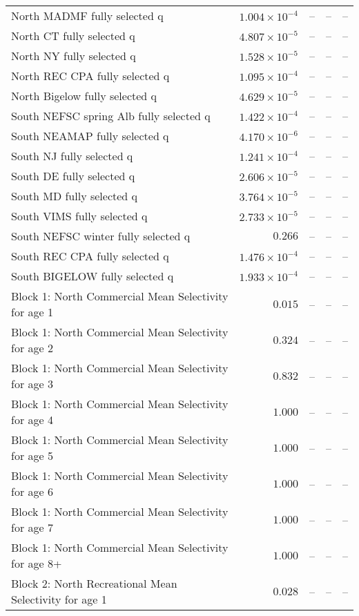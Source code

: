 \documentclass[
]{article}
\begin{document}
\begin{landscape}
\begin{longtable}[t]{lrrrr}
North MADMF fully selected q & $1.004\times 10^{-4}$ & -- & -- & --\\
North CT fully selected q & $4.807\times 10^{-5}$ & -- & -- & --\\
North NY fully selected q & $1.528\times 10^{-5}$ & -- & -- & --\\
\addlinespace
North REC CPA fully selected q & $1.095\times 10^{-4}$ & -- & -- & --\\
North Bigelow fully selected q & $4.629\times 10^{-5}$ & -- & -- & --\\
South NEFSC spring Alb fully selected q & $1.422\times 10^{-4}$ & -- & -- & --\\
South NEAMAP fully selected q & $4.170\times 10^{-6}$ & -- & -- & --\\
South NJ fully selected q & $1.241\times 10^{-4}$ & -- & -- & --\\
\addlinespace
South DE fully selected q & $2.606\times 10^{-5}$ & -- & -- & --\\
South MD fully selected q & $3.764\times 10^{-5}$ & -- & -- & --\\
South VIMS fully selected q & $2.733\times 10^{-5}$ & -- & -- & --\\
South NEFSC winter fully selected q & $0.266$ & -- & -- & --\\
South REC CPA fully selected q & $1.476\times 10^{-4}$ & -- & -- & --\\
\addlinespace
South BIGELOW fully selected q & $1.933\times 10^{-4}$ & -- & -- & --\\
Block 1: North Commercial Mean Selectivity for age 1 & $0.015$ & -- & -- & --\\
Block 1: North Commercial Mean Selectivity for age 2 & $0.324$ & -- & -- & --\\
Block 1: North Commercial Mean Selectivity for age 3 & $0.832$ & -- & -- & --\\
Block 1: North Commercial Mean Selectivity for age 4 & $1.000$ & -- & -- & --\\
\addlinespace
Block 1: North Commercial Mean Selectivity for age 5 & $1.000$ & -- & -- & --\\
Block 1: North Commercial Mean Selectivity for age 6 & $1.000$ & -- & -- & --\\
Block 1: North Commercial Mean Selectivity for age 7 & $1.000$ & -- & -- & --\\
Block 1: North Commercial Mean Selectivity for age 8+ & $1.000$ & -- & -- & --\\
Block 2: North Recreational Mean Selectivity for age 1 & $0.028$ & -- & -- & --\\

\end{longtable}
\end{landscape}
\end{document}
